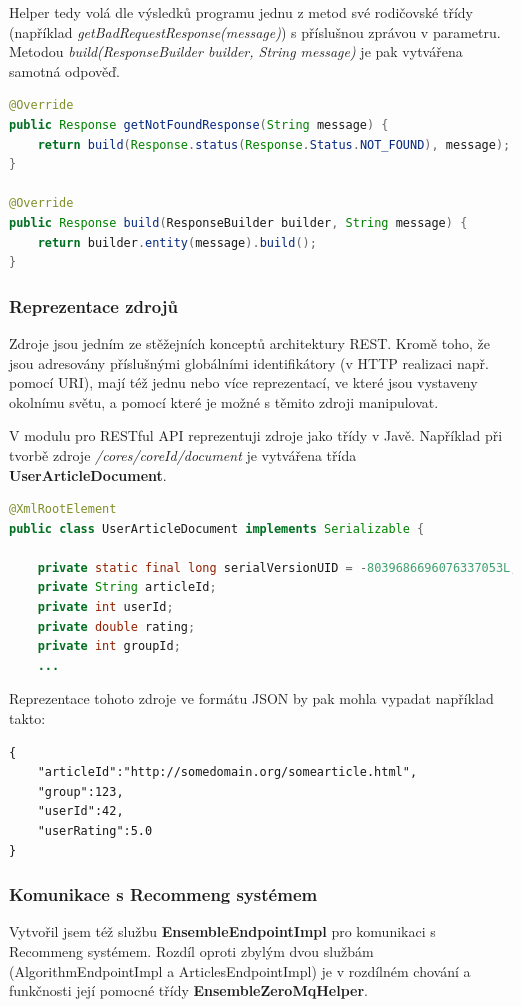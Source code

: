 \documentclass[thesis=M,czech]{FITthesis}[2014/05/07]
\begin{document}
Helper tedy volá dle výsledků programu jednu z metod své rodičovské třídy (například \emph{getBadRequestResponse(message)}) s příslušnou zprávou v parametru. Metodou \emph{build(ResponseBuilder builder, String message)} je pak vytvářena samotná odpověď.

\begin{lstlisting}[language=java]
@Override
public Response getNotFoundResponse(String message) {
    return build(Response.status(Response.Status.NOT_FOUND), message);
}    

@Override
public Response build(ResponseBuilder builder, String message) {
    return builder.entity(message).build();
}
\end{lstlisting}

\subsubsection{Reprezentace zdrojů}
\label{subsub:resource}
Zdroje jsou jedním ze stěžejních konceptů architektury REST. Kromě toho, že jsou adresovány příslušnými globálními identifikátory (v HTTP realizaci např. pomocí URI), mají též jednu nebo více reprezentací, ve které jsou vystaveny okolnímu světu, a pomocí které je možné s těmito zdroji manipulovat. 

V modulu pro RESTful API reprezentuji zdroje jako třídy v Javě. Například při tvorbě zdroje \emph{/cores/{coreId}/document} je vytvářena třída \textbf{UserArticleDocument}. 

\begin{lstlisting}[language=java]
@XmlRootElement
public class UserArticleDocument implements Serializable {       
    
    private static final long serialVersionUID = -8039686696076337053L;    
    private String articleId;
    private int userId;    
    private double rating;
    private int groupId;
    ...
\end{lstlisting}

Reprezentace tohoto zdroje ve formátu JSON by pak mohla vypadat například takto:

\begin{lstlisting}
{
    "articleId":"http://somedomain.org/somearticle.html",
    "group":123,
    "userId":42,
    "userRating":5.0
}
\end{lstlisting}

\subsubsection{Komunikace s Recommeng systémem}
\label{sec:restrec}
Vytvořil jsem též službu \textbf{EnsembleEndpointImpl} pro komunikaci s Recommeng systémem. Rozdíl oproti zbylým dvou službám (AlgorithmEndpointImpl a ArticlesEndpointImpl) je v rozdílném chování a funkčnosti její pomocné třídy \textbf{EnsembleZeroMqHelper}.
\end{document}
